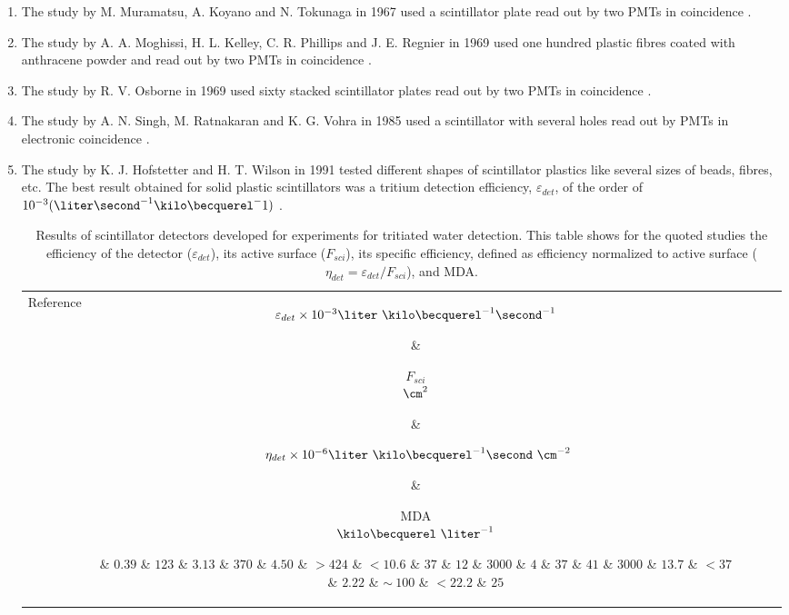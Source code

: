 \begin{enumerate}

\item{} The study by M. Muramatsu, A. Koyano and N. Tokunaga in 1967 used a scintillator plate read out by two PMTs in coincidence \cite{Muramatsu}.

\item{} The study by A. A. Moghissi, H. L. Kelley, C. R. Phillips and J. E. Regnier in 1969 used one hundred plastic fibres coated with anthracene powder and read out by two PMTs in coincidence \cite{Moghissi}.

\item{} The study by R. V. Osborne in 1969 used sixty stacked scintillator plates read out by two PMTs in coincidence \cite{Osborne}.

\item{} The study by A. N. Singh, M. Ratnakaran and K. G. Vohra in 1985 used a scintillator with several holes read out by PMTs in electronic coincidence \cite{Ratnakaran, Ratnakaran2000}.

\item{} The study by K. J. Hofstetter and H. T. Wilson in 1991 tested different shapes of scintillator plastics like several sizes of beads, fibres, etc. The best result obtained for solid plastic scintillators was a tritium detection efficiency, $\varepsilon_{det}$, of the order of $10^{-3}(\liter\second^{-1}\kilo\becquerel^{-}1)$ \cite{Hofstetter1, Hofstetter2}.

\begin{table}[htbp]
\centering{}%
\begin{tabular}{lcrcc}
\toprule 
Reference & \parbox{5em}{$\varepsilon_{det}\times10^{-3}\\\liter~\kilo\becquerel^{-1}\second^{-1}$}  & \parbox{3.5em}{\raggedleft $F_{sci}$\\ $\cm^2$}  & \parbox{6.5em}{$~\eta_{det}\times 10^{-6}\\\liter~\kilo\becquerel^{-1}\second~\cm^{-2}$} &  \parbox{3.5em}{MDA\\$\kilo\becquerel~\liter^{-1}$} \tabularnewline
\midrule
\midrule 
\cite{Muramatsu} & $0.39$ & $123$ & $3.13$ & $370$ \tabularnewline
\cite{Moghissi} & $4.50$ & $>424$ & $<10.6$ & $37$ \tabularnewline
\cite{Osborne} & $12$ & $3000$ & $4$ & $37$ \tabularnewline
\cite{Ratnakaran} & $41$ & $3000$ & $13.7$ & $<37$ \tabularnewline
\cite{Hofstetter1} & $2.22$ & $\sim~100$ & $<22.2$ & $25$ \tabularnewline
\bottomrule
\end{tabular}
\caption{Results of scintillator detectors developed for experiments for tritiated water detection. This table shows for the quoted studies the efficiency of the detector ($\varepsilon_{det}$), its active surface ($F_{sci}$), its specific efficiency, defined as efficiency normalized to active surface ($\eta_{det}=\varepsilon_{det}/F_{sci}$), and MDA.}
\label{tab:PlasticScinTritium}
\end{table}

\end{enumerate}

